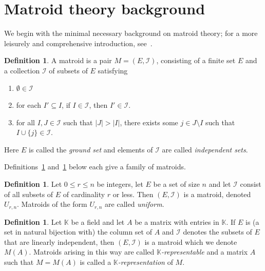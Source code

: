 \documentclass[12pt]{article}
\theoremstyle{definition}
\newtheorem{defn}[thm]{Definition}
\newtheorem{definition}[thm]{Definition}
\begin{document}
\section{Matroid theory background}\label{section: matroid background}

We begin with the minimal necessary background on matroid theory;
for a more leisurely and comprehensive introduction, see~\cite{oxley}.

\begin{definition}\label{defn: matroid}
    A matroid is a pair $M = (E, \mathcal{I})$, consisting of a finite set $E$ and a collection $\mathcal{I}$ of subsets of $E$ satisfying
\begin{enumerate}
    \item $\emptyset \in \mathcal{I}$ 
    \item for each $I' \subseteq I$, if $I \in \mathcal{I}$, then $I' \in \mathcal{I}$.
    \item for all $I, J \in \mathcal{I}$ such that $|J| > |I|$, there exists some $j \in J \setminus I$ such that $I \cup \{j\} \in \mathcal{I}$.
\end{enumerate}
Here $E$ is called the \emph{ground set} and elements of $\mathcal{I}$ are called \emph{independent sets}.
\end{definition}

Definitions~\ref{defn: uniform matroids} and~\ref{defn: representable matroids} below each give a family  of matroids.

\begin{defn}\label{defn: uniform matroids}
    Let $0 \le r \le n$ be integers, let $E$ be a set of size $n$ and let $\mathcal{I}$ consist of all subsets of $E$ of cardinality $r$ or less.
    Then $(E,\mathcal{I})$ is a matroid, denoted $U_{r,n}$.
    Matroids of the form $U_{r,n}$ are called \emph{uniform}.
\end{defn}

\begin{defn}\label{defn: representable matroids}
    Let $\mathbb{K}$ be a field and let $A$ be a matrix with entries in $\mathbb{K}$.
    If $E$ is (a set in natural bijection with) the column set of $A$ and $\mathcal{I}$ denotes the subsets of $E$ that are linearly independent,
    then $(E,\mathcal{I})$ is a matroid which we denote $M(A)$.
    Matroids arising in this way are called \emph{$\mathbb{K}$-representable}
    and a matrix $A$ such that $M = M(A)$ is called a \emph{$\mathbb{K}$-representation} of $M$.
\end{defn}
\end{document}
